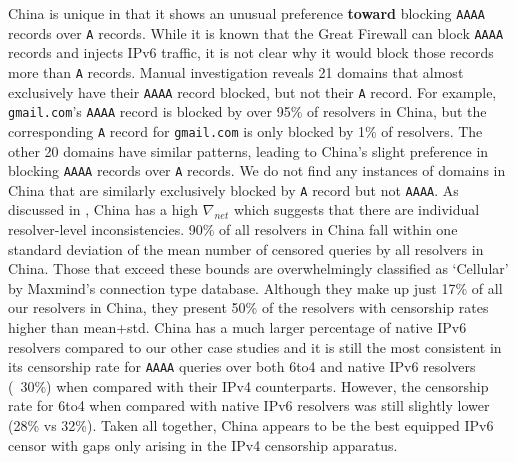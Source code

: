 China is unique in that it shows an unusual preference \textbf{toward} blocking
\texttt{AAAA} records over \texttt{A} records. While it is known that the Great
Firewall can block \texttt{AAAA} records and injects IPv6 traffic, it is not
clear why it would block those records more than \texttt{A} records. Manual
investigation reveals 21 domains that almost exclusively have their
\texttt{AAAA} record blocked, but not their \texttt{A} record. For example,
\texttt{gmail.com}'s \texttt{AAAA} record is blocked by over 95\% of resolvers
in China, but the corresponding \texttt{A} record for \texttt{gmail.com} is
only blocked by 1\% of resolvers. The other 20 domains have similar patterns,
leading to China's slight preference in blocking \texttt{AAAA} records over
\texttt{A} records. We do not find any instances of domains in China that are
similarly exclusively blocked by \texttt{A} record but not \texttt{AAAA}. 
%
As discussed in , China has a high
$\nabla_{net}$ which suggests that there are individual resolver-level
inconsistencies. 90\% of all resolvers in China fall within one standard
deviation of the mean number of censored queries by all resolvers in China.
Those that exceed these bounds are overwhelmingly classified as `Cellular' by
Maxmind's connection type database. Although they make up just 17\% of all our
resolvers in China, they present 50\% of the resolvers with censorship rates
higher than mean+std.
%
China has a much larger percentage of native IPv6 resolvers compared to our
other case studies and it is still the most consistent in its censorship rate
for \texttt{AAAA} queries over both 6to4 and native IPv6 resolvers (~30\%) when
compared with their IPv4 counterparts. However, the censorship rate for 6to4
when compared with native IPv6 resolvers was still slightly lower (28\% vs
32\%). 
%
Taken all together, China appears to be the best equipped IPv6 censor with gaps
only arising in the IPv4 censorship apparatus.






